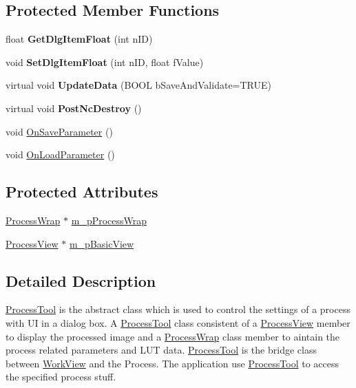 \subsection*{Protected Member Functions}
\begin{DoxyCompactItemize}
\item 
\mbox{\label{class_process_tool_a593e262bfa4f97671d404f17dc173a3a}} 
float {\bfseries Get\+Dlg\+Item\+Float} (int n\+ID)
\item 
\mbox{\label{class_process_tool_acff1c8e2b44509bc0ab9ae4e51e61ddc}} 
void {\bfseries Set\+Dlg\+Item\+Float} (int n\+ID, float f\+Value)
\item 
\mbox{\label{class_process_tool_acf5cdf0b306dcf0a9bda434cb4098120}} 
virtual void {\bfseries Update\+Data} (B\+O\+OL b\+Save\+And\+Validate=T\+R\+UE)
\item 
\mbox{\label{class_process_tool_ae1d455b1be56263db97e2cbb0e047d0a}} 
virtual void {\bfseries Post\+Nc\+Destroy} ()
\item 
void \mbox{\hyperlink{class_process_tool_aff87d429b43cdb20405a5036ec0a4d66}{On\+Save\+Parameter}} ()
\item 
void \mbox{\hyperlink{class_process_tool_a06656026e81c2da884f1130804aac780}{On\+Load\+Parameter}} ()
\end{DoxyCompactItemize}
\subsection*{Protected Attributes}
\begin{DoxyCompactItemize}
\item 
\mbox{\hyperlink{class_process_wrap}{Process\+Wrap}} $\ast$ \mbox{\hyperlink{class_process_tool_ae19c0d700f0a30bb0ca9d18e5397a562}{m\+\_\+p\+Process\+Wrap}}
\item 
\mbox{\hyperlink{class_process_view}{Process\+View}} $\ast$ \mbox{\hyperlink{class_process_tool_a775ff126073fabb52a8374c083058596}{m\+\_\+p\+Basic\+View}}
\end{DoxyCompactItemize}


\subsection{Detailed Description}
\mbox{\hyperlink{class_process_tool}{Process\+Tool}} is the abstract class which is used to control the settings of a process with UI in a dialog box. A \mbox{\hyperlink{class_process_tool}{Process\+Tool}} class consistent of a \mbox{\hyperlink{class_process_view}{Process\+View}} member to display the processed image and a \mbox{\hyperlink{class_process_wrap}{Process\+Wrap}} class member to aintain the process related parameters and L\+UT data. \mbox{\hyperlink{class_process_tool}{Process\+Tool}} is the bridge class between \mbox{\hyperlink{class_work_view}{Work\+View}} and the Process. The application use \mbox{\hyperlink{class_process_tool}{Process\+Tool}} to access the specified process stuff. 

